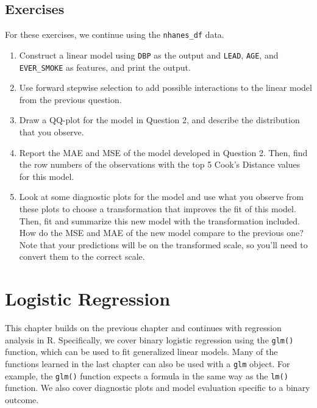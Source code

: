 \documentclass[
  letterpaper,
]{latex/krantz}
\begin{document}
\section{Exercises}\label{exercises-8}

For these exercises, we continue using the \texttt{nhanes\_df} data.

\begin{enumerate}
\def\labelenumi{\arabic{enumi}.}
\item
  Construct a linear model using \texttt{DBP} as the output and
  \texttt{LEAD}, \texttt{AGE}, and \texttt{EVER\_SMOKE} as features, and
  print the output.
\item
  Use forward stepwise selection to add possible interactions to the
  linear model from the previous question.
\item
  Draw a QQ-plot for the model in Question 2, and describe the
  distribution that you observe.
\item
  Report the MAE and MSE of the model developed in Question 2. Then,
  find the row numbers of the observations with the top 5 Cook's
  Distance values for this model.
\item
  Look at some diagnostic plots for the model and use what you observe
  from these plots to choose a transformation that improves the fit of
  this model. Then, fit and summarize this new model with the
  transformation included. How do the MSE and MAE of the new model
  compare to the previous one? Note that your predictions will be on the
  transformed scale, so you'll need to convert them to the correct
  scale.
\end{enumerate}

\chapter{Logistic Regression}\label{sec-logistic-regression}

This chapter builds on the previous chapter and continues with
regression analysis in R. Specifically, we cover binary logistic
regression using the \texttt{glm()}
function, which can be used to
fit generalized linear models. Many of the functions learned in the last
chapter can also be used with a \texttt{glm} object. For example, the
\texttt{glm()} function expects a formula in the same way as the
\texttt{lm()} function. We also cover diagnostic plots and model
evaluation specific to a binary outcome.
\end{document}

